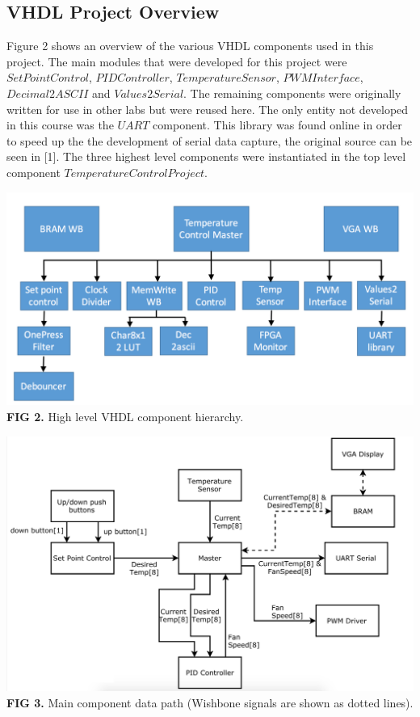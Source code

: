 \documentclass{article}
\begin{document}
\subsection{VHDL Project Overview}
Figure 2 shows an overview of the various VHDL components used in this project. The main modules that were developed for this project were $SetPointControl
$, $PIDController$, $TemperatureSensor$, $PWMInterface$, $Decimal2ASCII$ and $Values2Serial$. The remaining components were originally written for use in other labs but were reused here. The only entity not developed in this course was the $UART$ component. This library was found online in order to speed up the the development of serial data capture, the original source can be seen in [1]. The three highest level components were instantiated in the top level component $TemperatureControlProject$.
\begin{center}
\includegraphics[scale=.35]{images/vhdl_arch}\\
\textbf{FIG 2.} High level VHDL component hierarchy.\\
\end{center}
 
\begin{center}
\includegraphics[scale=.4]{images/internalFlow}\\
\textbf{FIG 3.} Main component data path (Wishbone signals are shown as dotted lines).\\
\end{center}
\end{document}
